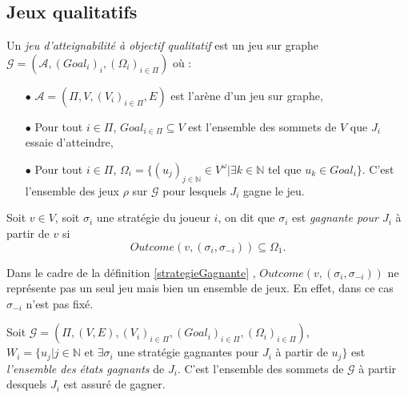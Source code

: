 

\subsection{Jeux qualitatifs}

	
	\begin{defi}
		Un \textit{jeu d'atteignabilité à objectif qualitatif} est un jeu sur graphe $\mathcal{G} = (\mathcal{A}, (Goal_{i})_{i},(\Omega _{i})_{i \in \Pi})$ où :
		\begin{enumerate}
			\item[$\bullet$] $\mathcal{A} = (\Pi,V,(V_{i})_{i \in \Pi}, E)$ est l'arène d'un jeu sur graphe,
			\item[$\bullet$] Pour tout $i \in \Pi$, $Goal_{i\in \Pi} \subseteq V $ est l'ensemble des sommets de $V$ que $J_{i}$ essaie d'atteindre,
			\item[$\bullet$] Pour tout $i \in \Pi$, $\Omega _{i} = \{(u_{j})_{j \in \mathbb{N}}\in V^{\omega}| \exists k \in \mathbb{N}$  tel que $u_{k}\in Goal_{i}\}$. C'est l'ensemble des jeux $\rho$ sur $\mathcal{G}$ pour lesquels $J_{i}$ gagne le jeu.
		\end{enumerate}	
	\end{defi}
	
	\label{strategieGagnante}
	\begin{defi}
		Soit $v \in V$, soit $\sigma _{i}$ une stratégie du joueur $i$, on dit que $\sigma _{i}$ est \textit{gagnante pour $J_{i}$} à partir de $v$ si 
		$$Outcome(v,(\sigma _{i}, \sigma _{-i})) \subseteq \Omega _{1}.$$
	\end{defi}
	
	\begin{rem}
		Dans le cadre de la définition \ref{strategieGagnante} , $Outcome(v,(\sigma _{i}, \sigma _{-i}))$ ne représente pas un seul jeu mais bien un ensemble de jeux. En effet, dans ce cas $\sigma _{-i}$ n'est pas fixé.
	\end{rem}
	
	
	\begin{defi}$ $\\
		Soit $\mathcal{G} = (\Pi,(V,E),(V_{i})_{i \in \Pi}, (Goal_{i})_{i \in \Pi},(\Omega _{i})_{i \in \Pi})$,\\
		$W_{i} = \{ u_{j} |j\in \mathbb{N}$ et $\exists \sigma _{i}$ une stratégie gagnantes pour $J_{i}$ à partir de $u_{j}\}$ est \textit{l'ensemble des états gagnants} de $J_{i}$. C'est l'ensemble des sommets de $\mathcal{G}$ à partir desquels $J_{i}$ est assuré de gagner.
	\end{defi}
	
